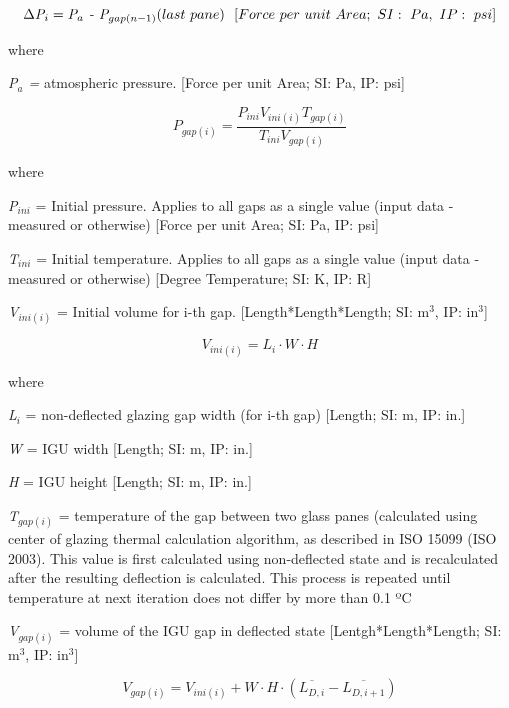 \begin{equation}
\emph{\(\Delta\)P\(_{i}\)} = \emph{P\(_{a}\) - P\(_{gap(n-1)}\)} (last~pane) {~~[}Force~per~unit~Area;~SI:~Pa,~IP:~psi{]}
\label{eq:IGUdPiLastPane}
\end{equation}

where

\emph{P\(_{a}\) =} atmospheric pressure. {[}Force per unit Area; SI: Pa, IP: psi{]}

\begin{equation}
{P_{gap\left( i \right)}} = \frac{{{P_{ini}}{V_{ini\left( i \right)}}{T_{gap\left( i \right)}}}}{{{T_{ini}}{V_{gap\left( i \right)}}}}
\end{equation}

where

\emph{P\(_{ini}\)} = Initial pressure. Applies to all gaps as a single value (input data - measured or otherwise) {[}Force per unit Area; SI: Pa, IP: psi{]}

\emph{T\(_{ini}\)} = Initial temperature. Applies to all gaps as a single value (input data - measured or otherwise) {[}Degree Temperature; SI: K, IP: R{]}

\emph{V\(_{ini(i)}\)} = Initial volume for i-th gap. {[}Length*Length*Length; SI: m\(^{3}\), IP: in\(^{3}\){]}

\begin{equation}
{V_{ini\left( i \right)}} = {L_i}\cdot W\cdot H
\end{equation}

where

\emph{L\(_{i}\)} = non-deflected glazing gap width (for i-th gap) {[}Length; SI: m, IP: in.{]}

\emph{W} = IGU width {[}Length; SI: m, IP: in.{]}

\emph{H} = IGU height {[}Length; SI: m, IP: in.{]}

\emph{T\(_{gap(i)}\)} = temperature of the gap between two glass panes (calculated using center of glazing thermal calculation algorithm, as described in ISO 15099 (ISO 2003). This value is first calculated using non-deflected state and is recalculated after the resulting deflection is calculated. This process is repeated until temperature at next iteration does not differ by more than 0.1 ºC

\emph{V\(_{gap(i)}\)} = volume of the IGU gap in deflected state {[}Lentgh*Length*Length; SI: m\(^{3}\), IP: in\(^{3}\){]}

\begin{equation}
{V_{gap\left( i \right)}} = {V_{ini\left( i \right)}} + W\cdot H\cdot \left( {\overline {{L_{D,i}}}  - \overline {{L_{D,i + 1}}} } \right)
\label{eq:IGUGapVolume}
\end{equation}

